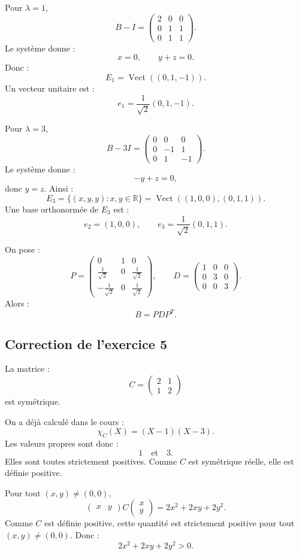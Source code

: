 \documentclass[11pt,a4paper]{article}
\newcommand{\R}{\mathbb R}
\newcommand{\Vect}{\operatorname{Vect}}
\begin{document}
Pour \(\lambda=1\),
\[
B-I=
\begin{pmatrix}
2&0&0\\
0&1&1\\
0&1&1
\end{pmatrix}.
\]
Le système donne :
\[
x=0,
\qquad
y+z=0.
\]
Donc :
\[
E_1=\Vect((0,1,-1)).
\]
Un vecteur unitaire est :
\[
e_1=\frac1{\sqrt2}(0,1,-1).
\]

Pour \(\lambda=3\),
\[
B-3I=
\begin{pmatrix}
0&0&0\\
0&-1&1\\
0&1&-1
\end{pmatrix}.
\]
Le système donne :
\[
-y+z=0,
\]
donc \(y=z\).  
Ainsi :
\[
E_3=\{(x,y,y):x,y\in\R\}
=
\Vect((1,0,0),(0,1,1)).
\]
Une base orthonormée de \(E_3\) est :
\[
e_2=(1,0,0),
\qquad
e_3=\frac1{\sqrt2}(0,1,1).
\]

On pose :
\[
P=
\begin{pmatrix}
0&1&0\\
\frac1{\sqrt2}&0&\frac1{\sqrt2}\\
-\frac1{\sqrt2}&0&\frac1{\sqrt2}
\end{pmatrix},
\qquad
D=
\begin{pmatrix}
1&0&0\\
0&3&0\\
0&0&3
\end{pmatrix}.
\]
Alors :
\[
B=PDP^T.
\]

\subsection*{Correction de l'exercice 5}

La matrice :
\[
C=
\begin{pmatrix}
2&1\\
1&2
\end{pmatrix}
\]
est symétrique.

On a déjà calculé dans le cours :
\[
\chi_C(X)=(X-1)(X-3).
\]
Les valeurs propres sont donc :
\[
1
\quad\text{et}\quad
3.
\]
Elles sont toutes strictement positives.  
Comme \(C\) est symétrique réelle, elle est définie positive.

Pour tout \((x,y)\neq(0,0)\),
\[
\begin{pmatrix}x&y\end{pmatrix}
C
\begin{pmatrix}x\\y\end{pmatrix}
=
2x^2+2xy+2y^2.
\]
Comme \(C\) est définie positive, cette quantité est strictement positive pour tout \((x,y)\neq(0,0)\).  
Donc :
\[
2x^2+2xy+2y^2>0.
\]
\end{document}
